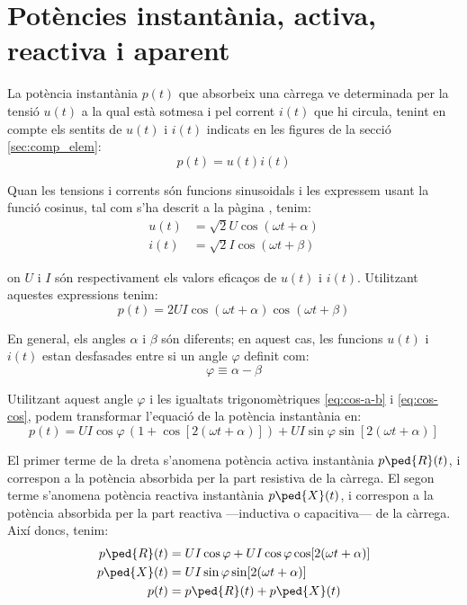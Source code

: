 \section{Potències instantània, activa,  reactiva i aparent}\label{sec:pot-inst-act-react}

La potència instantània $p(t)$ que absorbeix una càrrega ve determinada per la tensió $u(t)$ a la qual està sotmesa i pel corrent $i(t)$ que hi circula, tenint en compte els sentits de $u(t)$ i $i(t)$ indicats en les figures de la secció \ref{sec:comp_elem}:
\begin{equation}
   p(t) = u(t) i(t)
\end{equation}

Quan les tensions i corrents són funcions sinusoidals i les expressem usant la funció cosinus, tal com s'ha descrit a la pàgina \pageref{sec:fasors}, tenim:
\begin{align}
  u(t) &= \sqrt{2} U \cos(\omega t + \alpha) \\
  i(t) &= \sqrt{2} I \cos(\omega t + \beta)
\end{align}

on $U$ i $I$ són respectivament els valors eficaços de $u(t)$ i $i(t)$. Utilitzant aquestes expressions tenim:
\begin{equation}
   p(t) = 2 U I \cos(\omega t + \alpha) \cos(\omega t + \beta) \label{eq:p-instantania}
\end{equation}

En general, els angles $\alpha$ i $\beta$ són diferents; en aquest cas, les funcions $u(t)$ i $i(t)$ estan desfasades entre si un angle $\varphi$ definit com:
\begin{equation}
  \varphi \equiv \alpha - \beta
\end{equation}

Utilitzant aquest angle $\varphi$ i les igualtats trigonomètriques \eqref{eq:cos-a-b} i \eqref{eq:cos-cos}, podem transformar l'equació de la potència instantània en:
\begin{equation}
   p(t) = U I \cos\varphi \,(1 + \cos [2 (\omega t + \alpha)]) + U I \sin\varphi \sin[2 (\omega t + \alpha)]
\end{equation}

El primer terme de la dreta  s'anomena potència activa instantània $p\ped{R}(t)$, i correspon a la potència absorbida per la part resistiva de la càrrega. El segon terme  s'anomena potència reactiva instantània $p\ped{X}(t)$, i correspon a la potència absorbida per la part reactiva ---inductiva o capacitiva--- de la càrrega. Així doncs, tenim:
\begin{subequations}
\begin{align}
  p\ped{R}(t) &=  U I \cos\varphi + U I \cos\varphi \cos [2 (\omega t + \alpha)] \\
  p\ped{X}(t) &=  U I \sin\varphi \sin[2 (\omega t + \alpha)] \\
    p(t) &= p\ped{R}(t) + p\ped{X}(t)
\end{align}
\end{subequations}
	
